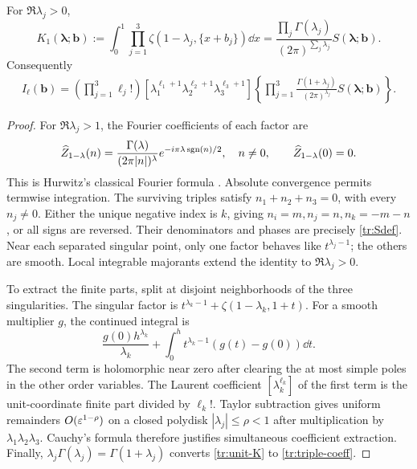 \begin{proposition}
\label{tr:unit-spectral}
For $\Re\lambda_j>0$,
\begin{equation}\label{tr:unit-K}
 K_1(\boldsymbol\lambda;\boldsymbol b)
 :=\int_0^1\prod_{j=1}^3\zeta(1-\lambda_j,\{x+b_j\})\dd x
  =\frac{\prod_j\Gamma(\lambda_j)}{(2\pi)^{\sum_j\lambda_j}}
       S(\boldsymbol\lambda;\boldsymbol b).
\end{equation}
Consequently
\begin{align}\label{tr:triple-coeff}
 I_{\boldsymbol\ell}(\boldsymbol b)
 =\left(\prod_{j=1}^3\ell_j!\right)
 [\lambda_1^{\ell_1+1}\lambda_2^{\ell_2+1}\lambda_3^{\ell_3+1}]
 \left\{\prod_{j=1}^3\frac{\Gamma(1+\lambda_j)}{(2\pi)^{\lambda_j}}
 S(\boldsymbol\lambda;\boldsymbol b)\right\}.
\end{align}
\end{proposition}
\begin{proof}
For $\Re\lambda_j>1$, the Fourier coefficients of each factor are
\[
 \widehat Z_{1-\lambda}(n)
  =\frac{\Gamma(\lambda)}{(2\pi|n|)^\lambda}
       e^{-i\pi\lambda\operatorname{sgn}(n)/2},\quad n\ne0,
 \qquad \widehat Z_{1-\lambda}(0)=0.
\]
This is Hurwitz's classical Fourier formula
\cite[Eq.~25.11.9]{dlmf-hurwitz}. Absolute convergence permits
termwise integration. The surviving triples satisfy
$n_1+n_2+n_3=0$, with every $n_j\ne0$. Either the unique negative
index is $k$, giving $n_i=m,n_j=n,n_k=-m-n$, or all signs are
reversed. Their denominators and phases are precisely
\eqref{tr:Sdef}. Near each separated singular point, only one factor
behaves like $t^{\lambda_j-1}$; the others are smooth. Local integrable
majorants extend the identity to $\Re\lambda_j>0$.

To extract the finite parts, split at disjoint neighborhoods of the
three singularities. The singular factor is
$t^{\lambda_k-1}+\zeta(1-\lambda_k,1+t)$. For a smooth multiplier
$g$, the continued integral is
\[
 \frac{g(0)h^{\lambda_k}}{\lambda_k}
 +\int_0^h t^{\lambda_k-1}(g(t)-g(0))\dd t.
\]
The second term is holomorphic near zero after clearing the at most
simple poles in the other order variables. The Laurent coefficient
$[\lambda_k^{\ell_k}]$ of the first term is the unit-coordinate
finite part divided by $\ell_k!$. Taylor subtraction gives uniform
remainders $O(\varepsilon^{1-\rho})$ on a closed polydisk
$|\lambda_j|\leq\rho<1$ after multiplication by
$\lambda_1\lambda_2\lambda_3$. Cauchy's formula therefore justifies
simultaneous coefficient extraction. Finally,
$\lambda_j\Gamma(\lambda_j)=\Gamma(1+\lambda_j)$ converts
\eqref{tr:unit-K} to \eqref{tr:triple-coeff}.
\end{proof}

